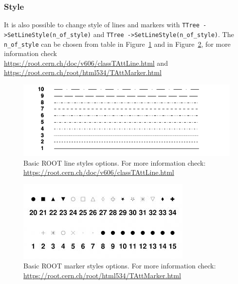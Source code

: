 \documentclass[12pt]{article}
\begin{document}
\subsubsection{Style}
It is also possible to change style of lines and markers with \verb|TTree ->SetLineStyle(n_of_style)| and  \verb|TTree ->SetLineStyle(n_of_style)|. The \verb|n_of_style| can be chosen from table in Figure~\ref{fig:root_linestyles} and in Figure~\ref{fig:root_markerstyles}, for more information check \\
\href{https://root.cern.ch/doc/v606/classTAttLine.html}{https://root.cern.ch/doc/v606/classTAttLine.html} and\\ \href{https://root.cern.ch/root/html534/TAttMarker.html}{https://root.cern.ch/root/html534/TAttMarker.html} \\

\begin{figure}[h]
\centering
\includegraphics[scale=0.5]{figs/root_linestyles.png}
\caption{Basic ROOT line styles options. For more information check: \href{https://root.cern.ch/doc/v606/classTAttLine.html}{https://root.cern.ch/doc/v606/classTAttLine.html} }
\label{fig:root_linestyles}
\end{figure}

\begin{figure}[h]
\centering
\includegraphics[scale=0.5]{figs/root_markerstyles.jpeg}
\caption{Basic ROOT marker styles options. For more information check: \href{https://root.cern.ch/root/html534/TAttMarker.html}{https://root.cern.ch/root/html534/TAttMarker.html}}
\label{fig:root_markerstyles}
\end{figure}
\end{document}
